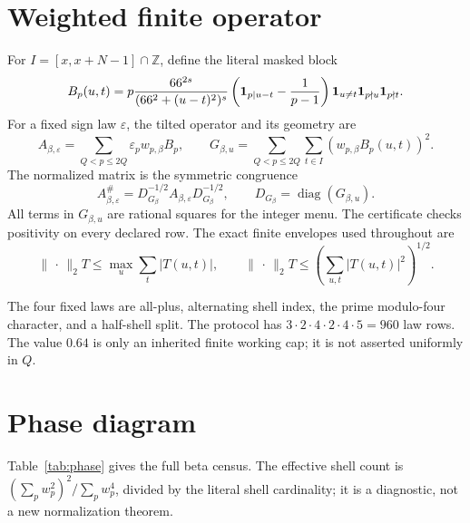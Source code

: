 \documentclass[10pt]{article}
\newcommand{\opnorm}{\lVert\,\cdot\,\rVert_2}
\begin{document}
\section{Weighted finite operator}

For $I=[x,x+N-1]\cap\mathbb Z$, define the literal masked block
\begin{equation}
B_p(u,t)=p\frac{66^{2s}}{(66^2+(u-t)^2)^s}
\left({\bf1}_{p\mid u-t}-\frac1{p-1}\right)
{\bf1}_{u\ne t}{\bf1}_{p\nmid u}{\bf1}_{p\nmid t}.
\label{eq:block}
\end{equation}
For a fixed sign law $\varepsilon$, the tilted operator and its geometry are
\begin{equation}
A_{\beta,\varepsilon}=\sum_{Q<p\leq2Q}\varepsilon_p w_{p,\beta}B_p,
\qquad
G_{\beta,u}=\sum_{Q<p\leq2Q}\sum_{t\in I}
                 (w_{p,\beta}B_p(u,t))^2.
\label{eq:weighted}
\end{equation}
The normalized matrix is the symmetric congruence
\begin{equation}
A_{\beta,\varepsilon}^{\#}=
D_{G_\beta}^{-1/2}A_{\beta,\varepsilon}D_{G_\beta}^{-1/2},
\qquad D_{G_\beta}=\operatorname{diag}(G_{\beta,u}).
\label{eq:norm}
\end{equation}
All terms in $G_{\beta,u}$ are rational squares for the integer menu.  The
certificate checks positivity on every declared row.  The exact finite
envelopes used throughout are
\begin{equation}
\opnorm{T}\leq\max_u\sum_t|T(u,t)|,
\qquad
\opnorm{T}\leq\left(\sum_{u,t}|T(u,t)|^2\right)^{1/2}.
\label{eq:envelopes}
\end{equation}

The four fixed laws are all-plus, alternating shell index, the prime
modulo-four character, and a half-shell split.  The protocol has
$3\cdot2\cdot4\cdot2\cdot4\cdot5=960$ law rows.  The value $0.64$ is only an
inherited finite working cap; it is not asserted uniformly in $Q$.

\section{Phase diagram}

Table~\ref{tab:phase} gives the full beta census.  The effective shell count
is $(\sum_pw_p^2)^2/\sum_pw_p^4$, divided by the literal shell cardinality;
it is a diagnostic, not a new normalization theorem.
\end{document}
